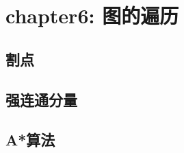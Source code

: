 \documentclass[./../main.tex]{subfiles}
\begin{document}
\section{chapter6: 图的遍历}
\subsection{割点}

\subsection{强连通分量}

\subsection{A*算法}
\end{document}
